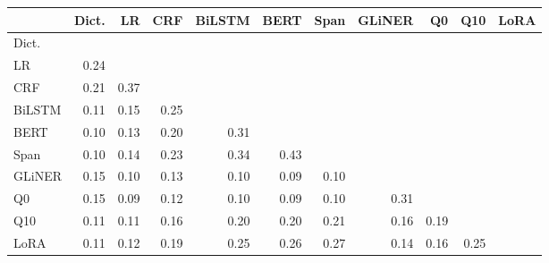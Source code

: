 \begin{tabular*}{\linewidth}{@{\extracolsep{\fill}}lrrrrrrrrrr@{}}
\toprule
 & Dict. & LR & CRF & BiLSTM & BERT & Span & GLiNER & Q0 & Q10 & LoRA \\
\midrule
Dict. &  &  &  &  &  &  &  &  &  &  \\
LR & 0.24 &  &  &  &  &  &  &  &  &  \\
CRF & 0.21 & 0.37 &  &  &  &  &  &  &  &  \\
BiLSTM & 0.11 & 0.15 & 0.25 &  &  &  &  &  &  &  \\
BERT & 0.10 & 0.13 & 0.20 & 0.31 &  &  &  &  &  &  \\
Span & 0.10 & 0.14 & 0.23 & 0.34 & 0.43 &  &  &  &  &  \\
GLiNER & 0.15 & 0.10 & 0.13 & 0.10 & 0.09 & 0.10 &  &  &  &  \\
Q0 & 0.15 & 0.09 & 0.12 & 0.10 & 0.09 & 0.10 & 0.31 &  &  &  \\
Q10 & 0.11 & 0.11 & 0.16 & 0.20 & 0.20 & 0.21 & 0.16 & 0.19 &  &  \\
LoRA & 0.11 & 0.12 & 0.19 & 0.25 & 0.26 & 0.27 & 0.14 & 0.16 & 0.25 &  \\
\bottomrule
\end{tabular*}
\endgroup
